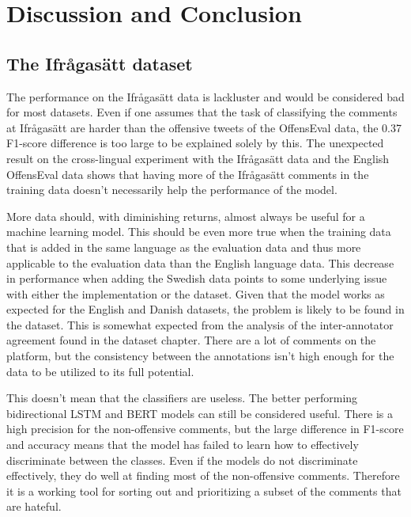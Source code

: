 \documentclass[nofilelist]{cslthse-msc}
\begin{document}

\chapter{Discussion and Conclusion}


\section{The Ifrågasätt dataset}

The performance on the Ifrågasätt data is lackluster and would be considered bad for most datasets. Even if one assumes that the task of classifying the comments at Ifrågasätt are harder than the offensive tweets of the OffensEval data, the 0.37 F1-score difference is too large to be explained solely by this. The unexpected result on the cross-lingual experiment with the Ifrågasätt data and the English OffensEval data shows that having more of the Ifrågasätt comments in the training data doesn't necessarily help the performance of the model. 


More data should, with diminishing returns, almost always be useful for a machine learning model. This should be even more true when the training data that is added in the same language as the evaluation data and thus more applicable to the evaluation data than the English language data. This decrease in performance when adding the Swedish data points to some underlying issue with either the implementation or the dataset. Given that the model works as expected for the English and Danish datasets, the problem is likely to be found in the dataset. This is somewhat expected from the analysis of the inter-annotator agreement found in the dataset chapter. There are a lot of comments on the platform, but the consistency between the annotations isn't high enough for the data to be utilized to its full potential. 

This doesn't mean that the classifiers are useless. The better performing bidirectional LSTM and BERT models can still be considered useful. There is a high precision for the non-offensive comments, but the large difference in F1-score and accuracy means that the model has failed to learn how to effectively discriminate between the classes.  Even if the models do not discriminate effectively, they do well at finding most of the non-offensive comments. Therefore it is a working tool for sorting out and prioritizing a subset of the comments that are hateful. 
\end{document}
